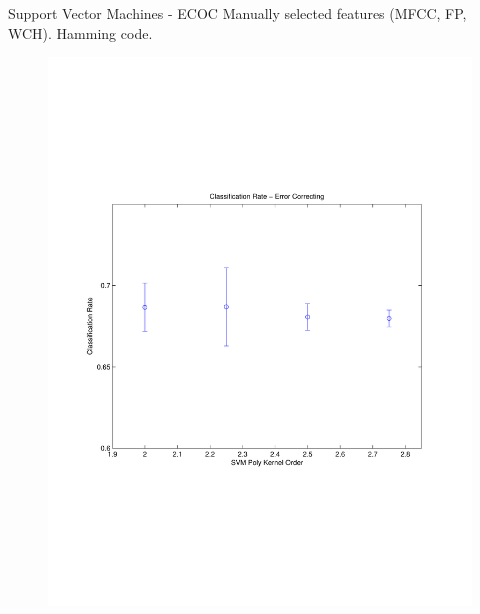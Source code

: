 \documentclass[xcolor=dvipsnames,t]{beamer} %
\begin{document}
\begin{frame}{Support Vector Machines - ECOC}
   Manually selected features (MFCC, FP, WCH).  Hamming code.
   ~\\[-9em]
   \begin{figure}
      \centering
      \includegraphics[width=\textwidth]{figures/optimSVMECOCOrder_WCH.pdf}
   \end{figure}
\end{frame}
\end{document}
